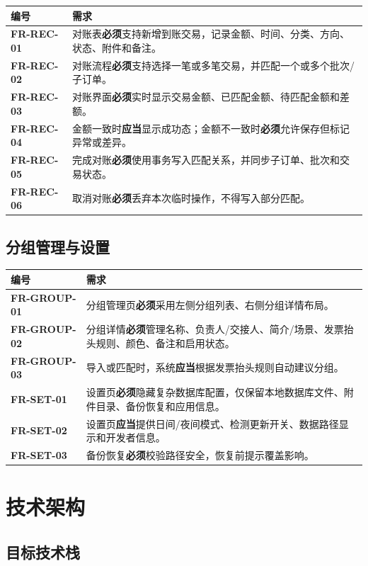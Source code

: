 \documentclass[UTF8,zihao=-4]{ctexart}
\newcommand{\req}[1]{\textbf{\textcolor{ivicBrown}{#1}}}
\newcommand{\must}{\textbf{必须}}
\newcommand{\should}{\textbf{应当}}
\begin{document}
\begin{longtable}{p{2.8cm}p{11.6cm}}
\toprule
编号 & 需求 \\
\midrule
\req{FR-REC-01} & 对账表\must{}支持新增到账交易，记录金额、时间、分类、方向、状态、附件和备注。 \\
\req{FR-REC-02} & 对账流程\must{}支持选择一笔或多笔交易，并匹配一个或多个批次/子订单。 \\
\req{FR-REC-03} & 对账界面\must{}实时显示交易金额、已匹配金额、待匹配金额和差额。 \\
\req{FR-REC-04} & 金额一致时\should{}显示成功态；金额不一致时\must{}允许保存但标记异常或差异。 \\
\req{FR-REC-05} & 完成对账\must{}使用事务写入匹配关系，并同步子订单、批次和交易状态。 \\
\req{FR-REC-06} & 取消对账\must{}丢弃本次临时操作，不得写入部分匹配。 \\
\bottomrule
\end{longtable}

\subsection{分组管理与设置}

\begin{longtable}{p{2.8cm}p{11.6cm}}
\toprule
编号 & 需求 \\
\midrule
\req{FR-GROUP-01} & 分组管理页\must{}采用左侧分组列表、右侧分组详情布局。 \\
\req{FR-GROUP-02} & 分组详情\must{}管理名称、负责人/交接人、简介/场景、发票抬头规则、颜色、备注和启用状态。 \\
\req{FR-GROUP-03} & 导入或匹配时，系统\should{}根据发票抬头规则自动建议分组。 \\
\req{FR-SET-01} & 设置页\must{}隐藏复杂数据库配置，仅保留本地数据库文件、附件目录、备份恢复和应用信息。 \\
\req{FR-SET-02} & 设置页\should{}提供日间/夜间模式、检测更新开关、数据路径显示和开发者信息。 \\
\req{FR-SET-03} & 备份恢复\must{}校验路径安全，恢复前提示覆盖影响。 \\
\bottomrule
\end{longtable}

\section{技术架构}

\subsection{目标技术栈}
\end{document}
